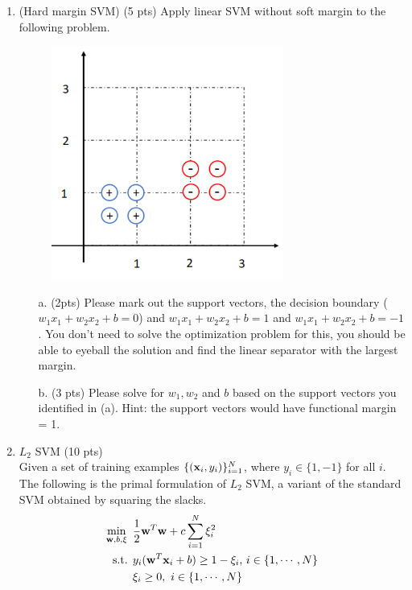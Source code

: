 \documentclass{article}
\def\x{{\bf x}}
\def\w{{\bf w}}
\begin{document}
\begin{enumerate}
\begin{itemize}
\end{itemize}
\item (Hard margin SVM) (5 pts) Apply linear SVM without soft margin to the 
following problem.
\begin{center}
\begin{figure}[h]
\includegraphics[width=3in]{svm.pdf}
\end{figure}
\end{center}

\begin{itemize} \item[a.] (2pts) Please mark out the support vectors, the 
decision boundary ($w_1x_1+w_2x_2 +b =0$) and $w_1x_1+w_2x_2+b =1$ and 
$w_1x_1+w_2x_2+b =-1$. You don't need to solve the optimization problem for 
this, you should be able to eyeball the solution and find the linear separator 
with the largest margin.

\item[b.] (3 pts) Please solve for $w_1, w_2$ and $b$ based on the support 
vectors you identified in (a). Hint: the support vectors would have functional 
margin = 1. \\
\end{itemize}
\item $L_2$ SVM (10 pts) \\
Given a set of training examples $\{(\x_i, y_i)\}_{i=1}^N$, where 
$y_i\in \{1, -1\}$ for all $i$. The following is the primal formulation of $L_2$ 
SVM, a variant of the standard SVM obtained by squaring the slacks.
\begin{align*}
\min_{\w, b, \xi} \mbox{ }& \frac{1}{2}\w^T\w+c\sum_{i=1}^N \xi_i^2 \\
\mbox{s.t. } & y_i(\w^T\x_i+b)\geq 1-\xi_i \mbox{,   } i \in \{1,\cdots,N\}\\
 & \xi_i\geq 0, \mbox{  }  i\in \{1,\cdots,N\}
\end{align*}


\end{enumerate}
\end{document}
